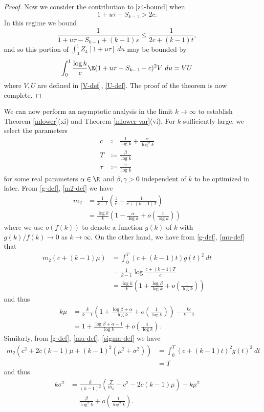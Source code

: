 \begin{proof}
Now we consider the contribution to \eqref{z4-bound} when
$$ 1+u\tau-S_{k-1} > 2c.$$
In this regime we bound
$$ \frac{1}{1+u\tau-S_{k-1}+(k-1)s} \leq \frac{1}{2c+(k-1)t},$$ 
and so this portion of $\int_0^1 Z_4[1+u\tau]\ du$ may be bounded by 
$$\int_0^1 \frac{\log k}{c} \E (1 + u\tau - S_{k-1} - c)^2 V\ du = VU$$
where $V, U$ are defined in \eqref{V-def}, \eqref{U-def}.  The proof of the theorem is now complete.
\end{proof}

We can now perform an asymptotic analysis in the limit $k \to \infty$ to establish Theorem \ref{mlower}(xi) and Theorem \ref{mlower-var}(vi).  For $k$ sufficiently large, we select the parameters
\begin{align*}
c &\coloneqq \frac{1}{\log k} + \frac{\alpha}{\log^2 k} \\
T &\coloneqq \frac{\beta}{\log k} \\
\tau &\coloneqq \frac{\gamma}{\log k}
\end{align*}
for some real parameters $\alpha \in \R$ and $\beta,\gamma > 0$ independent of $k$ to be optimized in later.  From \eqref{g-def}, \eqref{m2-def} we have
\begin{align*}
m_2 &= \frac{1}{k-1} ( \frac{1}{c} - \frac{1}{c+(k-1)T} ) \\
&= \frac{\log k}{k} (1 - \frac{\alpha}{\log k} + o( \frac{1}{\log k} ) )
\end{align*}
where we use $o(f(k))$ to denote a function $g(k)$ of $k$ with $g(k)/f(k) \to 0$ as $k \to \infty$.  On the other hand, we have from \eqref{g-def}, \eqref{mu-def} that
\begin{align*}
m_2 (c + (k-1) \mu) &= \int_0^T (c+(k-1)t) g(t)^2\ dt \\
&= \frac{1}{k-1} \log \frac{c+(k-1)T}{c} \\
&= \frac{\log k}{k} (1 + \frac{\log \beta}{\log k} + o( \frac{1}{\log k} ) )
\end{align*}
and thus
\begin{align*}
 k\mu &= \frac{k}{k-1} (1 + \frac{\log \beta + \alpha}{\log k} + o(\frac{1}{\log k} ) ) - \frac{kc}{k-1} \\
&= 1 + \frac{\log \beta + \alpha - 1}{\log k} + o( \frac{1}{\log k} ).
\end{align*}
Similarly, from \eqref{g-def}, \eqref{mu-def}, \eqref{sigma-def} we have
\begin{align*}
m_2 (c^2 + 2c(k-1)\mu + (k-1)^2 (\mu^2+\sigma^2)) &= \int_0^T (c+(k-1)t)^2 g(t)^2\ dt \\
&= T
\end{align*}
and thus
\begin{align*}
k \sigma^2 &= \frac{k}{(k-1)^2} (\frac{T}{m_2} - c^2 - 2c(k-1)\mu) - k \mu^2 \\
&= \frac{\beta}{\log^2 k} + o( \frac{1}{\log^2 k} ).
\end{align*}

